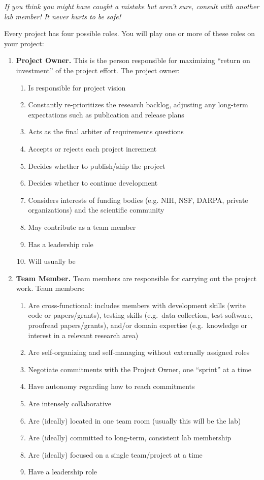 \documentclass{tufte-book} %
\begin{document}
\noindent \textit{If you think you might have caught a mistake but aren't
  sure, consult with another lab member! It never hurts to be safe!}




\noindent Every project has four possible roles.  You will play one or more of
these roles on your project:
\begin{enumerate}
\item \textbf{Project Owner.}  This is the person responsible for
  maximizing ``return on investment'' of the project effort.  The project owner:
\begin{enumerate}
\item Is responsible for project vision
\item Constantly re-prioritizes the research backlog, adjusting any
  long-term expectations such as publication and release plans
\item Acts as the final arbiter of requirements questions
\item Accepts or rejects each project increment
\item Decides whether to publish/ship the project
\item Decides whether to continue development
\item Considers interests of funding bodies (e.g. NIH, NSF, DARPA,
  private organizations) and the scientific community
\item May contribute as a team member
\item Has a leadership role
\item Will usually be \director
\end{enumerate}

\item \textbf{Team Member.}  Team members are responsible for carrying
  out the project work.  Team members:
\begin{enumerate}
\item Are cross-functional: includes members with development skills
  (write code or papers/grants), testing skills (e.g.\ data
  collection, test software, proofread papers/grants), and/or domain
  expertise (e.g.\ knowledge or interest in a relevant research area)
\item Are self-organizing and self-managing without externally assigned
  roles
\item Negotiate commitments with the Project Owner, one ``sprint'' at
  a time
\item Have autonomy regarding how to reach commitments
\item Are intensely collaborative
\item Are (ideally) located in one team room (usually this will be the lab)
\item Are (ideally) committed to long-term, consistent lab membership
\item Are (ideally) focused on a single team/project at a time
\item Have a leadership role
\end{enumerate}


\end{enumerate}
\end{document}
